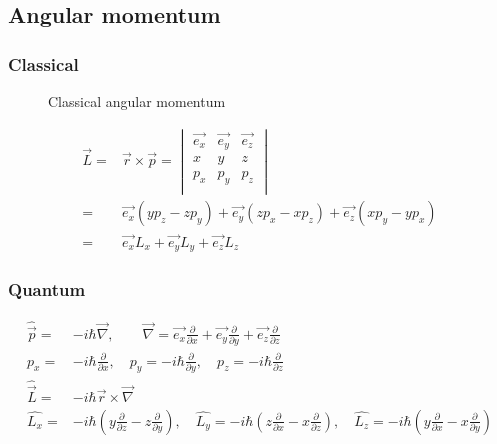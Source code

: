 	\subsection{Angular momentum}
	\label{sec:angmomentum}
	\subsubsection{Classical}
	\begin{figure}[!h]
		\centering
		
		\caption{Classical angular momentum}
		\label{clasmoment}
	\end{figure}
	
	\begin{align}
		\vec{L} =& \vec{r}\times\vec{p} =
		\begin{vmatrix}
			\vec{e_x} & \vec{e_y} & \vec{e_z} \\
			x & y & z \\
			p_x & p_y & p_z \\
		\end{vmatrix} \\
		=& \vec{e_x}(yp_z - zp_y) + \vec{e_y}(zp_x - xp_z) + \vec{e_z}(xp_y - yp_x) \\
		=& \vec{e_x}L_x + \vec{e_y}L_y + \vec{e_z}L_z
	\end{align}
	
	\subsubsection{Quantum}
	\begin{align}
		\hat{\vec{p}} =& -i\hbar\vec{\nabla}, \qquad \vec{\nabla} = \vec{e_x}\frac{\partial}{\partial x} + \vec{e_y}\frac{\partial}{\partial y} + \vec{e_z}\frac{\partial}{\partial z} \\
		p_x =& -i\hbar \frac{\partial}{\partial x}, \quad p_y = -i\hbar \frac{\partial}{\partial y}, \quad p_z = -i\hbar \frac{\partial}{\partial z} \\
		\hat{\vec{L}} =& -i\hbar\vec{r}\times\vec{\nabla} \\
		\hat{L_x} =& -i\hbar(y\frac{\partial}{\partial z} - z\frac{\partial}{\partial y}), \quad \hat{L_y} = -i\hbar(z\frac{\partial}{\partial x} - x\frac{\partial}{\partial z}), \quad \hat{L_z} = -i\hbar(y\frac{\partial}{\partial x} - x\frac{\partial}{\partial y}) 
	\end{align}
	
